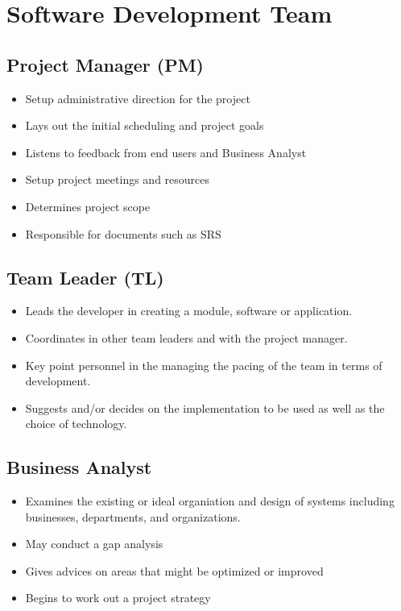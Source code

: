 \documentclass[9pt,twocolumn]{article}
\begin{document}
\section*{Software Development Team}
  \subsection*{Project Manager (PM)}
  \begin{itemize}
    \item Setup administrative direction for the project
    \item Lays out the initial scheduling and project goals
    \item Listens to feedback from end users and Business Analyst
    \item Setup project meetings and resources
    \item Determines project scope
    \item Responsible for documents such as SRS
  \end{itemize}

  \subsection*{Team Leader (TL)}
  \begin{itemize}
    \item Leads the developer in creating a module, software or application.
    \item Coordinates in other team leaders and with the project manager.
    \item Key point personnel in the managing the pacing of the team in terms of development.
    \item Suggests and/or decides on the implementation to be used as well as the choice of technology.
  \end{itemize}

  \subsection*{Business Analyst}
  \begin{itemize}
    \item Examines the existing or ideal organiation and design of systems including businesses, departments, and organizations.
    \item May conduct a gap analysis
    \item Gives advices on areas that might be optimized or improved
    \item Begins to work out a project strategy
  \end{itemize}
\end{document}
